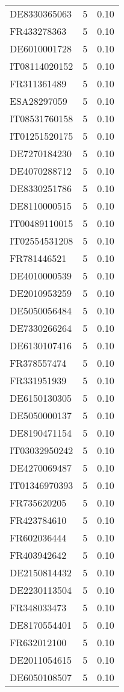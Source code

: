 \begin{table*}[htbp]
\begin{tabular}{lrr}
DE8330365063 & 5 & 0.10 \\
FR433278363 & 5 & 0.10 \\
DE6010001728 & 5 & 0.10 \\
IT08114020152 & 5 & 0.10 \\
FR311361489 & 5 & 0.10 \\
ESA28297059 & 5 & 0.10 \\
IT08531760158 & 5 & 0.10 \\
IT01251520175 & 5 & 0.10 \\
DE7270184230 & 5 & 0.10 \\
DE4070288712 & 5 & 0.10 \\
DE8330251786 & 5 & 0.10 \\
DE8110000515 & 5 & 0.10 \\
IT00489110015 & 5 & 0.10 \\
IT02554531208 & 5 & 0.10 \\
FR781446521 & 5 & 0.10 \\
DE4010000539 & 5 & 0.10 \\
DE2010953259 & 5 & 0.10 \\
DE5050056484 & 5 & 0.10 \\
DE7330266264 & 5 & 0.10 \\
DE6130107416 & 5 & 0.10 \\
FR378557474 & 5 & 0.10 \\
FR331951939 & 5 & 0.10 \\
DE6150130305 & 5 & 0.10 \\
DE5050000137 & 5 & 0.10 \\
DE8190471154 & 5 & 0.10 \\
IT03032950242 & 5 & 0.10 \\
DE4270069487 & 5 & 0.10 \\
IT01346970393 & 5 & 0.10 \\
FR735620205 & 5 & 0.10 \\
FR423784610 & 5 & 0.10 \\
FR602036444 & 5 & 0.10 \\
FR403942642 & 5 & 0.10 \\
DE2150814432 & 5 & 0.10 \\
DE2230113504 & 5 & 0.10 \\
FR348033473 & 5 & 0.10 \\
DE8170554401 & 5 & 0.10 \\
FR632012100 & 5 & 0.10 \\
DE2011054615 & 5 & 0.10 \\
DE6050108507 & 5 & 0.10 \\

\end{tabular}
\end{table*}
